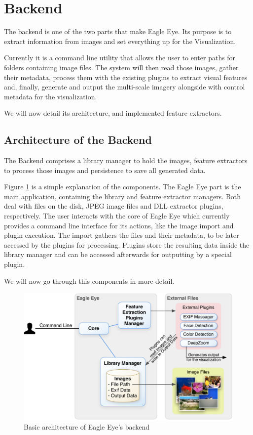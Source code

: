 \section{Backend} %
\label{sub:backend}

The backend is one of the two parts that make Eagle Eye. Its purpose is to extract information from images and set everything up for the Visualization.

Currently it is a command line utility that allows the user to enter paths for folders containing image files. The system will then read those images, gather their metadata, process them with the existing plugins to extract visual features and, finally, generate and output the multi-scale imagery  alongside with control metadata for the visualization.

We will now detail its architecture, and implemented feature extractors.

\subsection{Architecture of the Backend}

The Backend comprises a library manager to hold the images, feature extractors to process those images and persistence to save all generated data.

Figure \ref{fig:arch} is a simple explanation of the components. The Eagle Eye part is the main application, containing the library and feature extractor managers. Both deal with files on the disk, JPEG image files and DLL extractor plugins, respectively. The user interacts with the core of Eagle Eye which currently provides a command line interface for its actions, like the image import and plugin execution. The import gathers the files and their metadata, to be later accessed by the plugins for processing. Plugins store the resulting data inside the library manager and can be accessed afterwards for outputting by a special plugin.

We will now go through this components in more detail. 

\begin{figure}[ht]
	\centering
		\includegraphics[scale=0.7]{Figures/Architecture_v2.pdf}
	\caption{Basic architecture of Eagle Eye's backend}
	\label{fig:arch}
\end{figure}


